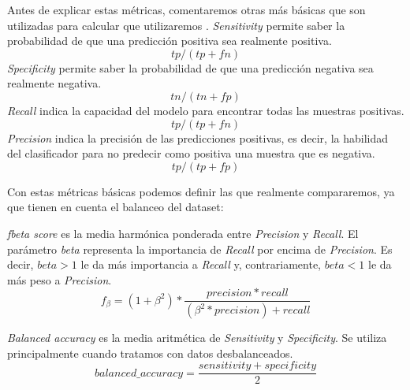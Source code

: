 Antes de explicar estas métricas, comentaremos otras más básicas que son utilizadas para calcular que utilizaremos \cite{Precisio23:online}.
\textit{Sensitivity} permite saber la probabilidad de que una predicción positiva sea realmente positiva.
    \begin{equation}
        tp/(tp+fn)
    \end{equation}
\textit{Specificity} permite saber la probabilidad de que una predicción negativa sea realmente negativa.
\begin{equation}
        tn/(tn+fp)
    \end{equation}
\textit{Recall} indica la capacidad del modelo para encontrar todas las muestras positivas. 
    \begin{equation}
        tp/(tp+fn)
    \end{equation}
\textit{Precision} indica la precisión de las predicciones positivas, es decir, la habilidad del clasificador para no predecir como positiva una muestra que es negativa.
    \begin{equation}
        tp/(tp+fp)
    \end{equation}

Con estas métricas básicas podemos definir las que realmente compararemos, ya que tienen en cuenta el balanceo del \gls{dataset}:

\textit{fbeta score} es la media harmónica ponderada entre \textit{Precision} y \textit{Recall}. El parámetro \textit{beta} representa la importancia de \textit{Recall} por encima de \textit{Precision}. Es decir, \(beta>1\) le da más importancia a \textit{Recall} y, contrariamente, \(beta<1\) le da más peso a \textit{Precision}. \cite{FscoreWi30:online}
    \begin{equation}
        f_\beta = (1 + \beta^2)*\frac{precision*recall}{(\beta^2*precision)+recall}
    \end{equation}

\textit{Balanced accuracy} es la media aritmética de \textit{Sensitivity} y \textit{Specificity}. Se utiliza principalmente cuando tratamos con datos desbalanceados. \cite{Balanced44:online}
    \begin{equation}
        balanced\_accuracy =\frac{sensitivity + specificity}{2}
    \end{equation}
